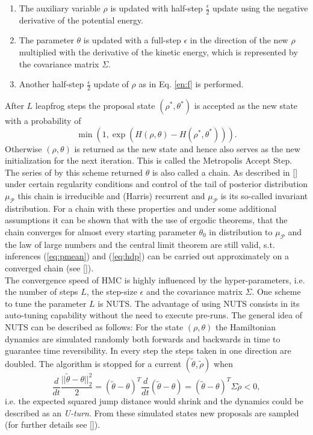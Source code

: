 \documentclass[12pt,letterpaper]{article}
\numberwithin{equation}{subsection}
\begin{document}
\begin{enumerate}
\item The auxiliary variable $\rho$ is updated with half-step $\frac{\epsilon}{2}$ update using the negative derivative of the potential energy.
\label{en:f}
\item The parameter $\theta$ is updated with a full-step $\epsilon$ in the direction of the new $\rho$ multiplied with the derivative of the kinetic energy, which is represented by the covariance matrix $\Sigma$.
\item Another half-step $\frac{\epsilon}{2}$ update of $\rho$ as in Eq. \ref{en:f} is performed.
\end{enumerate}  
After $L$ leapfrog steps the proposal state $(\rho^*,\theta^*)$ is accepted as the new state with a probability of 
\[\min(1, \exp(H(\rho, \theta)-H(\rho^*,\theta^*))).
\] Otherwise $(\rho, \theta)$ is returned as the new state and hence also serves as the new initialization for the next iteration. This is called the Metropolis Accept Step.\\
 The series of by this scheme returned $\theta$ is also called a chain. As described in [\cite{convhmc}] under certain regularity conditions and control of the tail of posterior distribution $\mu_\mathcal{P}$ this chain is irreducible and (Harris) recurrent and $\mu_\mathcal{P}$ is its so-called invariant distribution. For a chain with these properties and under some additional assumptions it can be shown that with the use of ergodic theorems, that the chain  converges for almost every starting parameter $\theta_0$ in distribution to $\mu_\mathcal{P}$ and the law of large numbers and the central limit theorem are still valid, s.t. 
inferences (\ref{eq:pmean}) and (\ref{eq:hdp}) can be carried out approximately on a converged chain (see [\cite{mcstability}]). \\
The convergence speed of HMC is highly influenced by the hyper-parameters, i.e. the number of steps $L$, the step-size $\epsilon$ and the covariance matrix $\Sigma$.
One scheme to tune the parameter $L$ is NUTS. The advantage of using NUTS consists in its auto-tuning capability without the need to execute pre-runs. The general idea of NUTS can be described as follows: For the state $(\rho,\theta)$ the Hamiltonian dynamics are simulated randomly both forwards and backwards in time to guarantee time reversibility. In every step the steps taken in one direction are doubled. The algorithm is stopped for a current $(\tilde{\theta},\tilde{\rho})$ when 
\begin{equation*}
\frac{d}{dt}\frac{||\tilde{\theta} - \theta||^2_2}{2} = (\tilde{\theta} -\theta )^T\frac{d}{dt}(\tilde{\theta} - \theta) = (\tilde{\theta} -\theta )^T\Sigma\tilde{\rho} < 0,
\end{equation*} i.e. the expected squared jump distance would shrink and the dynamics could be described as an \textit{U-turn}. From these simulated states new proposals are sampled (for further details see [\cite{nuts}]). 
\label{sec:HMC}
\end{document}
